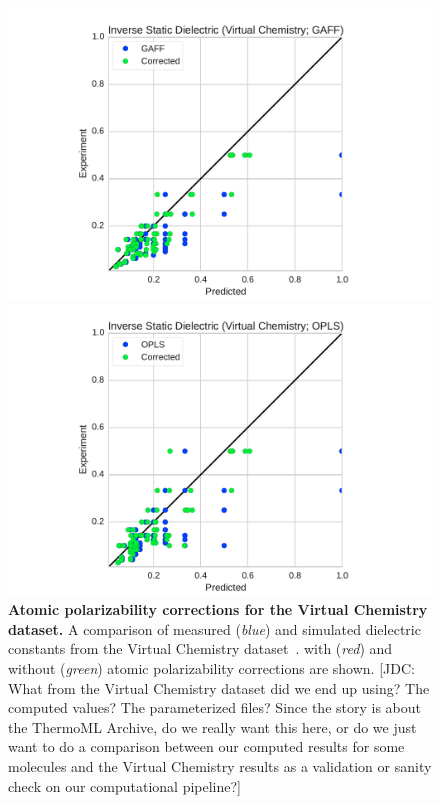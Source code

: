 \documentclass[aps,pre,twocolumn,nofootinbib,superscriptaddress,linenumbers]{revtex4-1}
\begin{document}
\begin{figure}

\includegraphics[width=\columnwidth]{./figures/dielectric_virtual_chemistry_gaff.pdf}

\includegraphics[width=\columnwidth]{./figures/dielectric_virtual_chemistry_opls.pdf}

\caption{{\bf Atomic polarizability corrections for the Virtual Chemistry dataset.}
A comparison of measured (\emph{blue}) and simulated dielectric constants from the Virtual Chemistry dataset~\cite{caleman2011force, van2012gromacs}.   with (\emph{red}) and without (\emph{green}) atomic polarizability corrections are shown.
{\color{red}[JDC: What from the Virtual Chemistry dataset did we end up using? The computed values? The parameterized files? Since the story is about the ThermoML Archive, do we really want this here, or do we just want to do a comparison between our computed results for some molecules and the Virtual Chemistry results as a validation or sanity check on our computational pipeline?]}
}
\label{figure:VirtualChemistry}
\end{figure}
\end{document}

